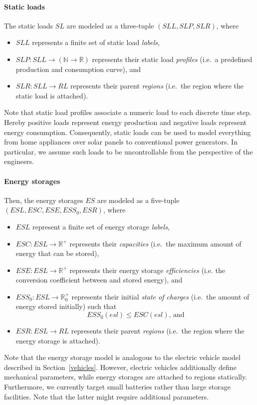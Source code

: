 \paragraph{Static loads}
\label{static_loads}

The static loads $SL$ are modeled as a three-tuple $(SLL, SLP, SLR)$, where
\begin{itemize}
	\item $SLL$ represents a finite set of static load \textit{labels},
	\item $SLP: SLL \rightarrow (\mathbb{N} \rightarrow \mathbb{R})$ represents their static load \textit{profiles} (i.e.\ a predefined production and consumption curve), and
	\item $SLR: SLL \rightarrow RL$ represents their parent \textit{regions} (i.e.\ the region where the static load is attached).
\end{itemize}
Note that static load profiles associate a numeric load to each discrete time step. Hereby positive loads represent energy production and negative loads represent energy consumption. Consequently, static loads can be used to model everything from home appliances over solar panels to conventional power generators. In particular, we assume such loads to be uncontrollable from the perspective of the engineers.

\paragraph{Energy storages}
\label{energy_storages}

Then, the energy storages $ES$ are modeled as a five-tuple $(ESL, ESC, ESE, ESS_0, ESR)$, where
\begin{itemize}
	\item $ESL$ represent a finite set of energy storage \textit{labels},
	\item $ESC: ESL \rightarrow \mathbb{R}^+$ represents their \textit{capacities} (i.e.\ the maximum amount of energy that can be stored),
	\item $ESE: ESL \rightarrow \mathbb{R}^+$ represents their energy storage \textit{efficiencies} (i.e. the conversion coefficient between  and stored energy), and
	\item $ESS_0: ESL \rightarrow \mathbb{R}_0^+$ represents their initial \textit{state of charges} (i.e.\ the amount of energy stored initially) such that
	\[
		ESS_0(esl) \leq ESC(esl) \textrm{, and}
	\]
	\item $ESR: ESL \rightarrow RL$ represents their parent \textit{regions} (i.e.\ the region where the energy storage is attached).
\end{itemize}
Note that the energy storage model is analogous to the electric vehicle model described in Section~\ref{vehicles}. However, electric vehicles additionally define mechanical parameters, while energy storages are attached to regions statically. Furthermore, we currently target small batteries rather than large storage facilities. Note that the latter might require additional parameters. 

